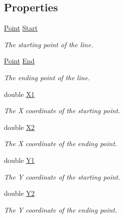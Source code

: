 \subsection*{Properties}
\begin{DoxyCompactItemize}
\item 
\mbox{\hyperlink{struct_s_g_l_1_1_point}{Point}} \mbox{\hyperlink{class_s_g_l_1_1_line_ad062108c742ed94352ffbd24153e7125}{Start}}
\begin{DoxyCompactList}\small\item\em The starting point of the line. \end{DoxyCompactList}\item 
\mbox{\hyperlink{struct_s_g_l_1_1_point}{Point}} \mbox{\hyperlink{class_s_g_l_1_1_line_a6b6a840b2b8ce27ed017946da182a10e}{End}}
\begin{DoxyCompactList}\small\item\em The ending point of the line. \end{DoxyCompactList}\item 
double \mbox{\hyperlink{class_s_g_l_1_1_line_a4485492024fc96d2db3aa34d699f974e}{X1}}
\begin{DoxyCompactList}\small\item\em The X coordinate of the starting point. \end{DoxyCompactList}\item 
double \mbox{\hyperlink{class_s_g_l_1_1_line_ab6dcb09fcf8983e99c5230d4321bbfc8}{X2}}
\begin{DoxyCompactList}\small\item\em The X coordinate of the ending point. \end{DoxyCompactList}\item 
double \mbox{\hyperlink{class_s_g_l_1_1_line_a1875f7240fd5be5323aaef118c9308c0}{Y1}}
\begin{DoxyCompactList}\small\item\em The Y coordinate of the starting point. \end{DoxyCompactList}\item 
double \mbox{\hyperlink{class_s_g_l_1_1_line_af3571b932c09f78f70e288770e266341}{Y2}}
\begin{DoxyCompactList}\small\item\em The Y coordinate of the ending point. \end{DoxyCompactList}\end{DoxyCompactItemize}


